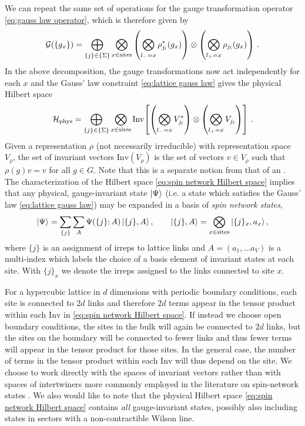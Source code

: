 We can repeat the same set of operations for the gauge transformation operator \eqref{eq:gauss law operator}, which is therefore given by
\begin{equation}
    \mathcal{G}(\{g_x\}) = \bigoplus_{\{j\} \in \{\Sigma\}} \bigotimes_{x \in \mathrm{sites}} \pqty{\bigotimes_{l_-=x} \rho_{j_l}^*(g_x)} \otimes \pqty{\bigotimes_{l_+=x} \rho_{j_l}(g_x) }\ .
\end{equation}
In the above decomposition, the gauge transformations now act independently for each $x$ and the Gauss' law constraint \eqref{eq:lattice gauss law} gives the physical Hilbert space
\begin{equation}
    \label{eq:spin network Hilbert space}
    \mathcal{H}_{\mathrm{phys}} = \bigoplus_{\{j\} \in \{\Sigma\}} \bigotimes_{x \in \mathrm{sites}} \mathrm{Inv}\bqty{\pqty{\bigotimes_{l_-=x} V_{j_l}^*} \otimes \pqty{\bigotimes_{l_+=x} V_{j_l} }} \ .
\end{equation}
Given a representation $\rho$ (not necessarily irreducible) with representation space $V_\rho$, the set of invariant vectors $\mathrm{Inv}(V_\rho)$ is the set of vectors $v \in V_\rho$ such that $\rho(g) v = v$ for all $g\in G$.
Note that this is a separate notion from that of an .
The characterization of the Hilbert space \eqref{eq:spin network Hilbert space} implies that any physical, gauge-invariant state $\ket{\Psi}$ (i.e.
a state which satisfies the Gauss' law \eqref{eq:lattice gauss law}) may be expanded in a basis of \textit{spin network states},
\begin{equation}
    \ket{\Psi} = \sum_{ \{j\} } \sum_{ A } \Psi(\{j\}; A) \ket{\{j\},A}, \qquad \ket{\{j\},A} = \bigotimes_{x \in \mathrm{sites}} \ket{\{j\}_x,a_x},
\end{equation}
where $\{j\}$ is an assignment of irreps to lattice links and $A=(a_1, \ldots a_V)$ is a multi-index which labels the choice of a basis element of invariant states at each site.
With $\{j\}_x$ we denote the irreps assigned to the links connected to site $x$.

For a hypercubic lattice in $d$ dimensions with periodic boundary conditions, each site is connected to $2d$ links and therefore $2d$ terms appear in the tensor product within each $\mathrm{Inv}$ in \eqref{eq:spin network Hilbert space}.
If instead we choose open boundary conditions, the sites in the bulk will again be connected to $2d$ links, but the sites on the boundary will be connected to fewer links and thus fewer terms will appear in the tensor product for those sites.
In the general case, the number of terms in the tensor product within each $\mathrm{Inv}$ will thus depend on the site.
We choose to work directly with the spaces of invariant vectors rather than with spaces of intertwiners more commonly employed in the literature on spin-network states \cite{baez1996spinnetworks, burgio2000physical}.
We also would like to note that the physical Hilbert space \eqref{eq:spin network Hilbert space} contains \textit{all} gauge-invariant states, possibly also including states in sectors with a non-contractible Wilson line.

